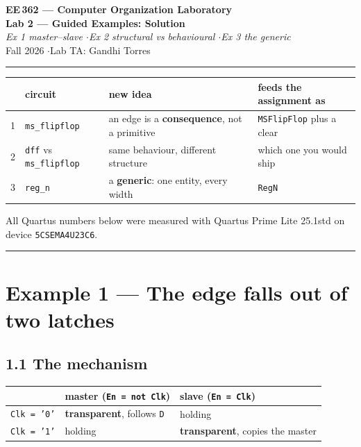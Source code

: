 \documentclass[11pt]{article}
\newcommand{\code}[1]{\texttt{#1}}
\newcommand{\hr}{\vspace{2pt}\hrule\vspace{6pt}}
\begin{document}
\begin{center}
{\Large\bfseries EE\,362 --- Computer Organization Laboratory}\\[2pt]
{\large\bfseries Lab 2 --- Guided Examples: Solution}\\[2pt]
{\itshape Ex 1 master--slave \quad$\cdot$\quad Ex 2 structural vs behavioural \quad$\cdot$\quad Ex 3 the generic}\\[4pt]
Fall 2026 \quad$\cdot$\quad Lab TA: Gandhi Torres
\end{center}
\hr

\begin{center}
\begin{tabular}{clll}
\toprule
& circuit & new idea & feeds the assignment as \\
\midrule
1 & \code{ms\_flipflop} & an edge is a \textbf{consequence}, not a primitive & \code{MSFlipFlop} plus a clear \\
2 & \code{dff} vs \code{ms\_flipflop} & same behaviour, different structure & which one you would ship \\
3 & \code{reg\_n} & a \textbf{generic}: one entity, every width & \code{RegN} \\
\bottomrule
\end{tabular}
\end{center}

All Quartus numbers below were measured with Quartus Prime Lite 25.1std on device
\code{5CSEMA4U23C6}.

\vspace{4pt}\hr

\section*{Example 1 --- The edge falls out of two latches}

\subsection*{1.1 The mechanism}

\begin{center}
\begin{tabular}{lll}
\toprule
& master (\code{En = not Clk}) & slave (\code{En = Clk}) \\
\midrule
\code{Clk = '0'} & \textbf{transparent}, follows \code{D} & holding \\
\code{Clk = '1'} & holding & \textbf{transparent}, copies the master \\
\bottomrule
\end{tabular}
\end{center}
\end{document}
